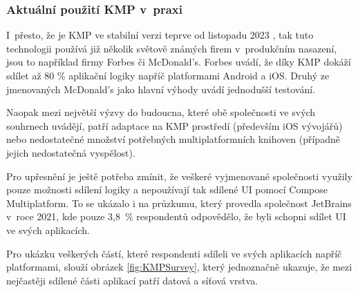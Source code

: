 \subsubsection*{Aktuální použití KMP v~praxi} \label{kmpInPractise}

I~přesto, že je KMP ve stabilní verzi teprve od listopadu 2023 \cite{KMPstable}, tak tuto technologii používá již několik světově 
známých firem v~produkčním nasazení, jsou to například firmy Forbes či McDonald's. Forbes uvádí, že díky KMP dokáží sdílet až 80 \%
aplikační logiky napříč platformami Android a iOS. \cite{KMPinForbes} 
Druhý ze jmenovaných McDonald's jako hlavní výhody uvádí jednodušší testování. \cite{KMPinMcDonalds}

Naopak mezi největší výzvy do budoucna, které obě společnosti ve svých souhrnech uvádějí, patří adaptace na KMP prostředí (především iOS vývojářů) nebo
nedostatečné množství potřebných multiplatformních knihoven (případně jejich nedostatečná vyspělost). \cite{KMPinForbes} \cite{KMPinMcDonalds}




\bigskip

Pro upřesnění je ještě potřeba zmínit, že veškeré vyjmenované společnosti využily pouze možnosti sdílení logiky a nepoužívají
tak sdílené UI pomocí Compose Multiplatform.
To se ukázalo i na průzkumu, který provedla společnost JetBrains v~roce 2021, kde pouze 3,8~\% respondentů odpovědělo, že byli schopni sdílet UI ve svých aplikacích.

Pro ukázku veškerých částí, které respondenti sdíleli ve svých aplikacích napříč platformami, slouží obrázek \ref{fig:KMPSurvey}, který jednoznačně ukazuje, že
mezi nejčastěji sdílené části aplikací patří datová a síťová vrstva.  

